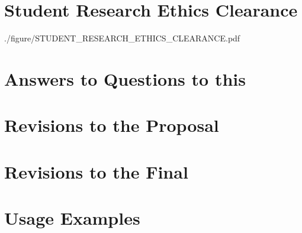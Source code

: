 \chapter{Student Research Ethics Clearance}

{./figure/STUDENT_RESEARCH_ETHICS_CLEARANCE.pdf}
\cleardoublepage

\chapter{Answers to Questions to this \documentType}

\cleardoublepage

\chapter{Revisions to the Proposal} 
\label{ch:revisions_to_the_proposal}

\cleardoublepage

\chapter{Revisions to the Final} 
\label{ch:revisions_to_the_final}

\cleardoublepage

\chapter{Usage Examples} 
\label{ch:usage_examples}

\cleardoublepage

\ifPubList
	
\fi
\cleardoublepage

\ifVita
	
\fi
\cleardoublepage

\ifIndex
	\printindex
\fi
\cleardoublepage

